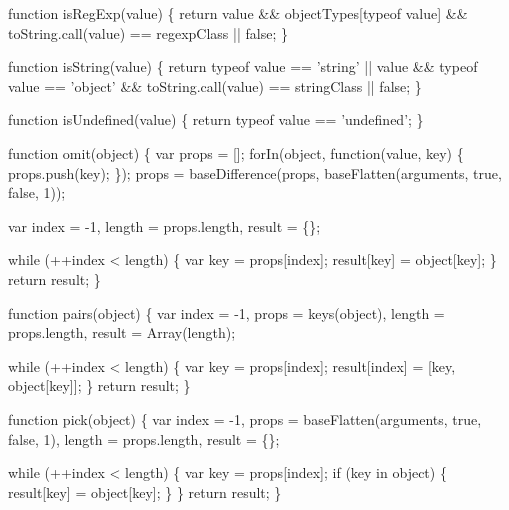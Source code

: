 \begin{DoxyCodeInclude}
{{  \textcolor{keyword}{function} isRegExp(value) \{
    \textcolor{keywordflow}{return} value && objectTypes[typeof value] && toString.call(value) == regexpClass || \textcolor{keyword}{false};
  \}

  \textcolor{keyword}{function} isString(value) \{
    \textcolor{keywordflow}{return} typeof value == \textcolor{stringliteral}{'string'} ||
      value && typeof value == \textcolor{stringliteral}{'object'} && toString.call(value) == stringClass || \textcolor{keyword}{false};
  \}

  \textcolor{keyword}{function} isUndefined(value) \{
    \textcolor{keywordflow}{return} typeof value == \textcolor{stringliteral}{'undefined'};
  \}

  \textcolor{keyword}{function} omit(\textcolor{keywordtype}{object}) \{
    var props = [];
    forIn(\textcolor{keywordtype}{object}, \textcolor{keyword}{function}(value, key) \{
      props.push(key);
    \});
    props = baseDifference(props, baseFlatten(arguments, \textcolor{keyword}{true}, \textcolor{keyword}{false}, 1));

    var index = -1,
        length = props.length,
        result = \{\};

    \textcolor{keywordflow}{while} (++index < length) \{
      var key = props[index];
      result[key] = \textcolor{keywordtype}{object}[key];
    \}
    \textcolor{keywordflow}{return} result;
  \}

  \textcolor{keyword}{function} pairs(\textcolor{keywordtype}{object}) \{
    var index = -1,
        props = keys(\textcolor{keywordtype}{object}),
        length = props.length,
        result = Array(length);

    \textcolor{keywordflow}{while} (++index < length) \{
      var key = props[index];
      result[index] = [key, \textcolor{keywordtype}{object}[key]];
    \}
    \textcolor{keywordflow}{return} result;
  \}

  \textcolor{keyword}{function} pick(\textcolor{keywordtype}{object}) \{
    var index = -1,
        props = baseFlatten(arguments, \textcolor{keyword}{true}, \textcolor{keyword}{false}, 1),
        length = props.length,
        result = \{\};

    \textcolor{keywordflow}{while} (++index < length) \{
      var key = props[index];
      \textcolor{keywordflow}{if} (key in \textcolor{keywordtype}{object}) \{
        result[key] = \textcolor{keywordtype}{object}[key];
      \}
    \}
    \textcolor{keywordflow}{return} result;
  \}

}}
\end{DoxyCodeInclude}
